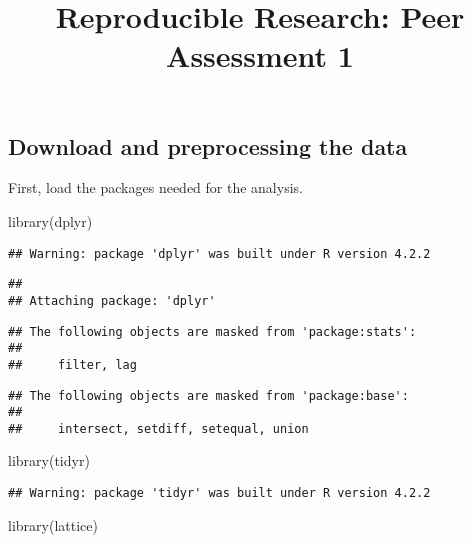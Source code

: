 \documentclass[
]{article}
\title{Reproducible Research: Peer Assessment 1}
\author{}
\date{\vspace{-2.5em}}
\newenvironment{Shaded}{\begin{snugshade}}{\end{snugshade}}
\newcommand{\FunctionTok}[1]{\textcolor[rgb]{0.00,0.00,0.00}{#1}}
\newcommand{\NormalTok}[1]{#1}
\begin{document}
\maketitle

\hypertarget{download-and-preprocessing-the-data}{%
\subsection{Download and preprocessing the
data}\label{download-and-preprocessing-the-data}}

First, load the packages needed for the analysis.

\begin{Shaded}
\begin{Highlighting}[]
\FunctionTok{library}\NormalTok{(dplyr)}
\end{Highlighting}
\end{Shaded}

\begin{verbatim}
## Warning: package 'dplyr' was built under R version 4.2.2
\end{verbatim}

\begin{verbatim}
## 
## Attaching package: 'dplyr'
\end{verbatim}

\begin{verbatim}
## The following objects are masked from 'package:stats':
## 
##     filter, lag
\end{verbatim}

\begin{verbatim}
## The following objects are masked from 'package:base':
## 
##     intersect, setdiff, setequal, union
\end{verbatim}

\begin{Shaded}
\begin{Highlighting}[]
\FunctionTok{library}\NormalTok{(tidyr)}
\end{Highlighting}
\end{Shaded}

\begin{verbatim}
## Warning: package 'tidyr' was built under R version 4.2.2
\end{verbatim}

\begin{Shaded}
\begin{Highlighting}[]
\FunctionTok{library}\NormalTok{(lattice)}
\end{Highlighting}
\end{Shaded}
\end{document}
